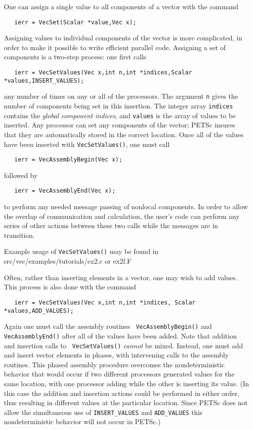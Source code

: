 One can assign a single value to all components of a vector with the 
command 
\begin{verbatim}
   ierr = VecSet(Scalar *value,Vec x);
\end{verbatim}
Assigning values to individual components of the vector is more 
complicated, in order to make it possible to write efficient parallel 
code.  Assigning a set of components is a two-step process: one 
first calls   
\begin{verbatim}
   ierr = VecSetValues(Vec x,int n,int *indices,Scalar *values,INSERT_VALUES);
\end{verbatim}
any number of times on any or all of the processors. The argument
{\tt n} gives the number of components being set in this 
insertion. The integer array {\tt indices} contains the {\em global component
indices}, and {\tt values} is the array of values to be inserted.
Any processor can set any components of the vector; PETSc insures that 
they are automatically stored in the correct location.
Once all of the values have been inserted with {\tt VecSetValues()},
one must call 
\begin{verbatim}
   ierr = VecAssemblyBegin(Vec x);
\end{verbatim}
followed by  
\begin{verbatim}
   ierr = VecAssemblyEnd(Vec x);
\end{verbatim}
to perform any needed message passing of nonlocal components.
In order to allow the overlap of communication and calculation,
the user's code can perform any series of other actions between these 
two calls while the messages are in transition. 

Example usage of {\tt VecSetValues()} may be found in 
{src/vec/examples/tutorials/ex2.c or ex2f.F}

Often, rather than inserting elements in a vector, one may wish to 
add values. This process 
is also done with the command 
\begin{verbatim}
   ierr = VecSetValues(Vec x,int n,int *indices, Scalar *values,ADD_VALUES);
\end{verbatim}
Again  one must call the assembly routines {\tt
VecAssemblyBegin()} and {\tt VecAssemblyEnd()} after all of the values
have been added.  Note that addition and insertion calls to {\tt
VecSetValues()} {\em cannot} be mixed.  Instead, one must add and insert
vector elements in phases, with intervening calls to the assembly
routines. This phased assembly procedure overcomes the nondeterministic
behavior that
would occur if two different processors generated values
for the same location, with one processor adding while the other is inserting
its value.  (In this case the addition and insertion actions could be performed 
in either order,
thus resulting in different values at the particular location. Since
PETSc does not allow the simultaneous use of {\tt INSERT\_VALUES} and
{\tt ADD\_VALUES} this nondeterministic behavior will not occur in PETSc.)


